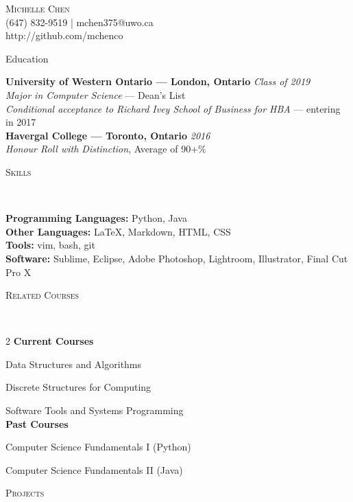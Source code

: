 \documentclass[9pt]{article}
\newenvironment{changemargin}[2]{%
  \begin{list}{}{%
    \setlength{\topsep}{0pt}%
    \setlength{\leftmargin}{#1}%
    \setlength{\rightmargin}{#2}%
    \setlength{\listparindent}{\parindent}%
    \setlength{\itemindent}{\parindent}%
    \setlength{\parsep}{\parskip}%
  }%
  \item[]}{\end{list}
}
\newcommand{\lineover}{
	\begin{changemargin}{-0.05in}{-0.05in}
		\vspace*{-8pt}
		\hrulefill \\
		\vspace*{-2pt}
	\end{changemargin}
}
\newcommand{\header}[1]{
	\begin{changemargin}{-0.5in}{-0.5in}
		\scshape{#1}\\
  	\lineover
	\end{changemargin}
}
\newcommand{\contact}[4]{
	\begin{changemargin}{-0.5in}{-0.5in}
		\begin{center}
			{\Large \scshape {#1}}\\ \smallskip
			{#2}\\ \smallskip 
			{#3}\\ \smallskip
			{#4}\smallskip
		\end{center}
	\end{changemargin}
}
\newenvironment{body} {
	\vspace*{-16pt}
	\begin{changemargin}{-0.25in}{-0.5in}
  }	
	{\end{changemargin}
}
\begin{document}
\thispagestyle{empty}
\pagestyle{empty} 

\contact{Michelle Chen}{(647) 832-9519 | mchen375@uwo.ca}{http://github.com/mchenco}


\header{Education}

\begin{body}
	\vspace{14pt}
    \textbf{University of Western Ontario --- London, Ontario}{} \hfill \emph{Class of 2019} \\
    \emph{Major in Computer Science} --- Dean's List \\
    \emph{Conditional acceptance to Richard Ivey School of Business for HBA} --- entering in 2017\\
    \medskip
	\textbf{Havergal College --- Toronto, Ontario} \hfill \emph{2016} \\
	\emph{Honour Roll with Distinction}, Average of 90+\%\\
\end{body}

\bigskip


\header{Skills}
\begin{body}
    \vspace{14pt}
    \textbf{Programming Languages:}{} Python, Java \\
    \medskip
    \textbf{Other Languages:}{} \LaTeX, Markdown, HTML, CSS \\
    \medskip
    \textbf{Tools:}{} vim, bash, git\\
    \medskip
    \textbf{Software:}{} Sublime, Eclipse, Adobe Photoshop, Lightroom, Illustrator, Final Cut Pro X\\
\end{body}

\bigskip

\header{Related Courses}
\begin{body}
    \vspace{6pt}
\begin{multicols}{2}
    \textbf{Current Courses}
    \item Data Structures and Algorithms
    \item Discrete Structures for Computing
    \item Software Tools and Systems Programming \\
    \columnbreak
    \textbf{Past Courses}
    \item Computer Science Fundamentals I (Python)
    \item Computer Science Fundamentals II (Java)
\end{multicols}
\end{body}
\header{Projects}
\end{document}

